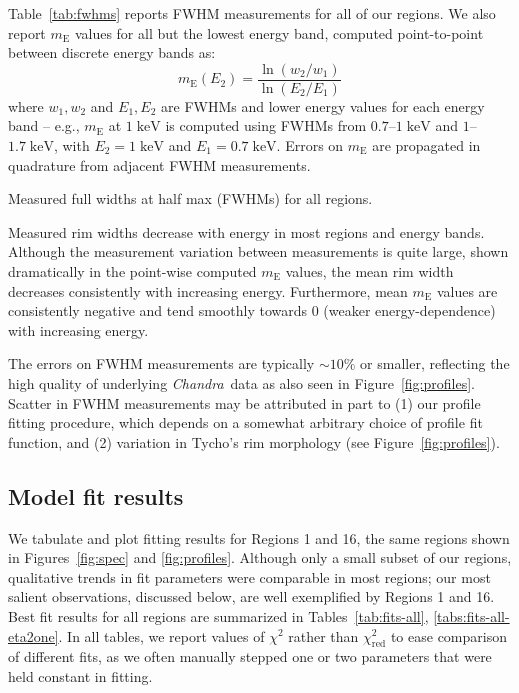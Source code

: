 \documentclass[iop, apj, numberedappendix]{emulateapj}
\newcommand*{\mt}{\mathrm}
\newcommand*{\unit}[1]{\;\mt{#1}}  %
\newcommand*{\abt}{\mathord{\sim}} %
\newcommand*{\Chandra}{\textit{Chandra}\ }
\newcommand*{\mE}{m_\mt{E}}
\begin{document}
Table~\ref{tab:fwhms} reports FWHM measurements for all of our regions.
We also report $\mE$ values for all but the lowest energy band, computed
point-to-point between discrete energy bands as:
\begin{equation}
    \mE(E_2) = \frac{\ln(w_2/w_1)}{\ln(E_2/E_1)}
\end{equation}
where $w_1, w_2$ and $E_1, E_2$ are FWHMs and lower energy values for each
energy band -- e.g., $\mE$ at $1 \unit{keV}$ is computed using FWHMs from
$0.7$--$1 \unit{keV}$ and $1$--$1.7 \unit{keV}$, with $E_2 = 1 \unit{keV}$ and
$E_1 = 0.7 \unit{keV}$.  Errors on $\mE$ are propagated in quadrature from
adjacent FWHM measurements.

\begin{table*}
    \tiny
    \centering
    \caption{Measured full widths at half max (FWHMs) for all regions.
             \label{tab:fwhms}}
    
\end{table*}

Measured rim widths decrease with energy in most regions and energy bands.
Although the measurement variation between measurements is quite large, shown
dramatically in the point-wise computed $\mE$ values, the mean rim width
decreases consistently with increasing energy.  Furthermore, mean $\mE$ values
are consistently negative and tend smoothly towards $0$ (weaker
energy-dependence) with increasing energy.

The errors on FWHM measurements are typically $\abt 10\%$ or smaller,
reflecting the high quality of underlying \Chandra data as also seen in
Figure~\ref{fig:profiles}.  Scatter in FWHM measurements may be attributed in
part to (1) our profile fitting procedure, which depends on a somewhat
arbitrary choice of profile fit function, and (2) variation in Tycho's rim
morphology (see Figure~\ref{fig:profiles}).

\subsection{Model fit results}
\label{sec:fit-results}

We tabulate and plot fitting results for Regions 1 and 16, the same regions
shown in Figures~\ref{fig:spec} and \ref{fig:profiles}.  Although only a small
subset of our regions, qualitative trends in fit parameters were comparable in
most regions; our most salient observations, discussed below, are well
exemplified by Regions 1 and 16.  Best fit results for all regions are
summarized in Tables~\ref{tab:fits-all}, \ref{tabs:fits-all-eta2one}.  In all
tables, we report values of $\chi^2$ rather than $\chi^2_\mt{red}$ to ease
comparison of different fits, as we often manually stepped one or two
parameters that were held constant in fitting.
\end{document}
